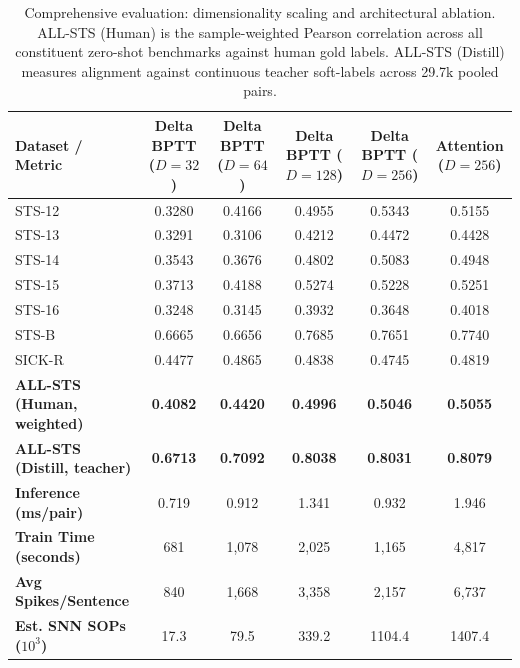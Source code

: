 \documentclass[11pt, conference, compsoc, twoside]{IEEEtran}
\begin{document}
\begin{table}[t!]
\begin{center}
{\caption{Comprehensive evaluation: dimensionality scaling and architectural ablation. ALL-STS (Human) is the sample-weighted Pearson correlation across all constituent zero-shot benchmarks against human gold labels. ALL-STS (Distill) measures alignment against continuous teacher soft-labels across 29.7k pooled pairs.}\label{tab:main_results}}
\setlength{\tabcolsep}{4pt}


\begin{tabular}{lccccc}
\toprule
\textbf{Dataset / Metric} & \shortstack{\textbf{Delta BPTT}\\(\textbf{$D{=}32$})} & \shortstack{\textbf{Delta BPTT}\\(\textbf{$D{=}64$})} & \shortstack{\textbf{Delta BPTT}\\(\textbf{$D{=}128$})} & \shortstack{\textbf{Delta BPTT}\\(\textbf{$D{=}256$})} & \shortstack{\textbf{Attention}\\(\textbf{$D{=}256$})} \\
\midrule
STS-12 & 0.3280 & 0.4166 & 0.4955 & 0.5343 & 0.5155 \\
STS-13 & 0.3291 & 0.3106 & 0.4212 & 0.4472 & 0.4428 \\
STS-14 & 0.3543 & 0.3676 & 0.4802 & 0.5083 & 0.4948 \\
STS-15 & 0.3713 & 0.4188 & 0.5274 & 0.5228 & 0.5251 \\
STS-16 & 0.3248 & 0.3145 & 0.3932 & 0.3648 & 0.4018 \\
STS-B & 0.6665 & 0.6656 & 0.7685 & 0.7651 & 0.7740 \\
SICK-R & 0.4477 & 0.4865 & 0.4838 & 0.4745 & 0.4819 \\
\midrule
\textbf{ALL-STS (Human, weighted)} & \textbf{0.4082} & \textbf{0.4420} & \textbf{0.4996} & \textbf{0.5046} & \textbf{0.5055} \\
\textbf{ALL-STS (Distill, teacher)} & \textbf{0.6713} & \textbf{0.7092} & \textbf{0.8038} & \textbf{0.8031} & \textbf{0.8079} \\
\midrule
\textbf{Inference (ms/pair)} & 0.719 & 0.912 & 1.341 & 0.932 & 1.946 \\
\textbf{Train Time (seconds)} & 681 & 1,078 & 2,025 & 1,165 & 4,817 \\
\textbf{Avg Spikes/Sentence} & 840 & 1,668 & 3,358 & 2,157 & 6,737 \\
\textbf{Est. SNN SOPs ($10^3$)} & 17.3 & 79.5 & 339.2 & 1104.4 & 1407.4 \\
\bottomrule
\end{tabular}
%
\end{center}
\end{table}
\end{document}
